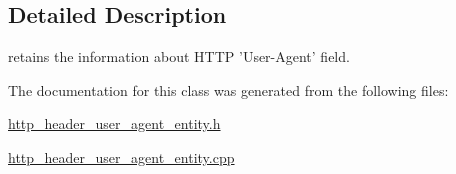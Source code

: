 \subsection{Detailed Description}
retains the information about H\-T\-T\-P 'User-\/\-Agent' field. 

The documentation for this class was generated from the following files\-:\begin{DoxyCompactItemize}
\item 
\hyperlink{http__header__user__agent__entity_8h}{http\-\_\-header\-\_\-user\-\_\-agent\-\_\-entity.\-h}\item 
\hyperlink{http__header__user__agent__entity_8cpp}{http\-\_\-header\-\_\-user\-\_\-agent\-\_\-entity.\-cpp}\end{DoxyCompactItemize}
